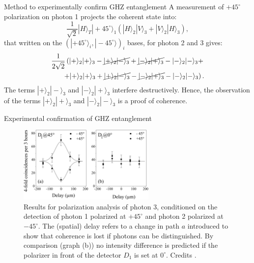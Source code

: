 \documentclass[10pt]{beamer}
\begin{document}
\begin{frame}{Method to experimentally confirm GHZ entanglement}
  A measurement of $+45^\circ$ polarization on photon 1 projects the coherent state into:
  \begin{equation*}
    \frac{1}{\sqrt{2}} |H\rangle_T |+ 45^\circ\rangle_1 \left( |H\rangle_2 |V\rangle_3 + |V\rangle_2 |H\rangle_3 \right),
  \end{equation*}
  that written on the $( |+ 45^\circ\rangle_i, |- 45^\circ\rangle)_i$ bases, for photon 2 and 3 gives:
  \begin{equation*}
    \begin{split}
      \frac{1}{2 \sqrt{2}} \left( |+\rangle_2 |+\rangle_3 - \cancel{|+\rangle_2 |-\rangle_3} + \cancel{|-\rangle_2 |+\rangle_3} - |-\rangle_2 |-\rangle_3 + \right.\\
      \left. + |+\rangle_2 |+\rangle_3 + \cancel{|+\rangle_2 |-\rangle_3} - \cancel{|-\rangle_2 |+\rangle_3} - |-\rangle_2 |-\rangle_3 \right).
    \end{split}
  \end{equation*}
  The terms $|+\rangle_2 |-\rangle_3$ and $|-\rangle_2 |+\rangle_3$ interfere destructively. Hence, the observation of the terms $|+\rangle_2 |+\rangle_3$ and $|-\rangle_2 |-\rangle_3$ is a proof of coherence.
\end{frame}





\begin{frame}{Experimental confirmation of GHZ entanglement}
  \begin{figure}
    \includegraphics[width=0.6\textwidth]{Images/ghz-entanglement-exp-proof.png}
    \caption{Results for polarization analysis of photon 3, conditioned on the detection of photon 1 polarized at $+ 45^\circ$ and photon 2 polarized at $- 45^\circ$. The (spatial) delay refers to a change in path $a$ introduced to show that coherence is lost if photons can be distinguished. By comparison (graph (b)) no intensity difference is predicted if the polarizer in front of the detector $D_1$ is set at $0^\circ$. Credits \cite{PhysRevLett.82.1345}.}
  \end{figure}
\end{frame}
\end{document}

